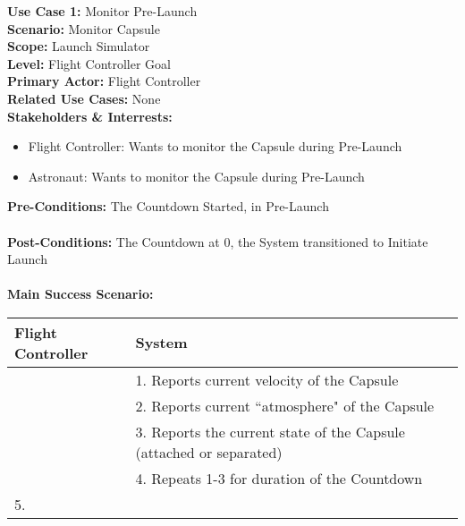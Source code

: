\documentclass[letterpaper]{article}
\begin{document}
\noindent
\textbf{Use Case 1:}  Monitor Pre-Launch\\
\textbf{Scenario:  }Monitor Capsule\\
\textbf{Scope:  }Launch Simulator\\
\textbf{Level:  }Flight Controller Goal\\
\textbf{Primary Actor:  }Flight Controller\\
\textbf{Related Use Cases:  }None\\
\textbf{Stakeholders \& Interrests:}
\begin{itemize}
\item Flight Controller:  Wants to monitor the Capsule during
Pre-Launch
\item Astronaut:  Wants to monitor the Capsule during
Pre-Launch
\end{itemize}
\textbf{Pre-Conditions:  }The Countdown Started, in Pre-Launch\\\\
\textbf{Post-Conditions:  }The Countdown at 0, the System transitioned
to Initiate Launch\\\\
\textbf{Main Success Scenario:}\\
\begin{tabular}{|p{5.75cm}|p{5.75cm}|}\hline
\textbf{Flight Controller} & \textbf{System}\\\hline
& 1.  Reports current velocity of the Capsule\\\hline
& 2.  Reports current ``atmosphere" of the Capsule\\\hline
& 3.  Reports the current state of the Capsule (attached or
separated)\\\hline
& 4.  Repeats 1-3 for duration of the Countdown\\\hline
5.  
\end{tabular}\\\\
\end{document}
